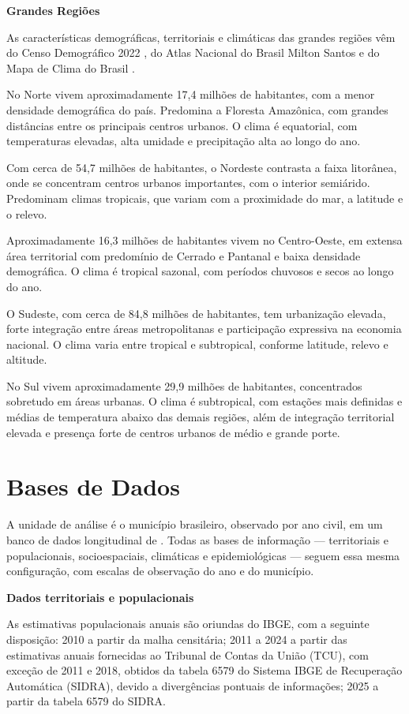 \noindent \textbf{Grandes Regiões}

As características demográficas, territoriais e climáticas das grandes regiões vêm do Censo Demográfico 2022 \cite{ibge2022censo}, do Atlas Nacional do Brasil Milton Santos \cite{ibge2022atlas} e do Mapa de Clima do Brasil \cite{ibge2002clima}.

No Norte vivem aproximadamente 17,4 milhões de habitantes, com a menor densidade demográfica do país. Predomina a Floresta Amazônica, com grandes distâncias entre os principais centros urbanos. O clima é equatorial, com temperaturas elevadas, alta umidade e precipitação alta ao longo do ano.

Com cerca de 54,7 milhões de habitantes, o Nordeste contrasta a faixa litorânea, onde se concentram centros urbanos importantes, com o interior semiárido. Predominam climas tropicais, que variam com a proximidade do mar, a latitude e o relevo.

Aproximadamente 16,3 milhões de habitantes vivem no Centro-Oeste, em extensa área territorial com predomínio de Cerrado e Pantanal e baixa densidade demográfica. O clima é tropical sazonal, com períodos chuvosos e secos ao longo do ano.

O Sudeste, com cerca de 84,8 milhões de habitantes, tem urbanização elevada, forte integração entre áreas metropolitanas e participação expressiva na economia nacional. O clima varia entre tropical e subtropical, conforme latitude, relevo e altitude.

No Sul vivem aproximadamente 29,9 milhões de habitantes, concentrados sobretudo em áreas urbanas. O clima é subtropical, com estações mais definidas e médias de temperatura abaixo das demais regiões, além de integração territorial elevada e presença forte de centros urbanos de médio e grande porte.

\section{Bases de Dados}
\label{sec:bases_dados}

A unidade de análise é o município brasileiro, observado por ano civil, em um banco de dados longitudinal de \PeriodoEstudo{}. Todas as bases de informação — territoriais e populacionais, socioespaciais, climáticas e epidemiológicas — seguem essa mesma configuração, com escalas de observação do ano e do município.

\noindent \textbf{Dados territoriais e populacionais}

As estimativas populacionais anuais são oriundas do IBGE, com a seguinte disposição: 2010 a partir da malha censitária; 2011 a 2024 a partir das estimativas anuais fornecidas ao Tribunal de Contas da União (TCU), com exceção de 2011 e 2018, obtidos da tabela 6579 do Sistema IBGE de Recuperação Automática (SIDRA), devido a divergências pontuais de informações; 2025 a partir da tabela 6579 do SIDRA.

